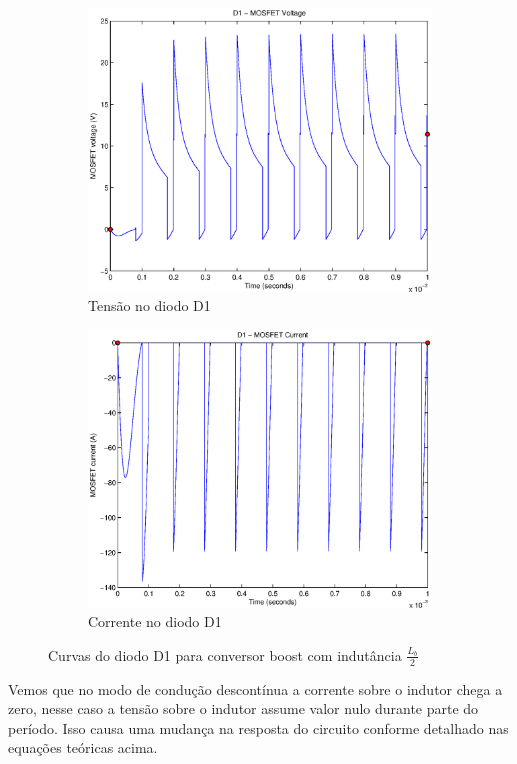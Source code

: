 \documentclass{article}
\begin{document}
\begin{figure}[H]
	\centering
	\begin{subfigure}[b]{0.4\linewidth}
		\includegraphics[width=\linewidth]{matlab/boost/r_d1v2}
		\caption{Tensão no diodo D1}
	\end{subfigure}
	\begin{subfigure}[b]{0.4\linewidth}
		\centering
		\includegraphics[width=\linewidth]{matlab/boost/r_d1i2}
		\caption{Corrente no diodo D1}
	\end{subfigure}
	\caption{Curvas do diodo D1 para conversor boost com indutância $\frac{L_b}{2}$}
	\label{fig:bod12}
\end{figure}

Vemos que no modo de condução descontínua a corrente sobre o indutor chega a zero, nesse caso a tensão sobre o indutor assume valor nulo durante parte do período. Isso causa uma mudança na resposta do circuito conforme detalhado nas equações teóricas acima.

%
\end{document}
